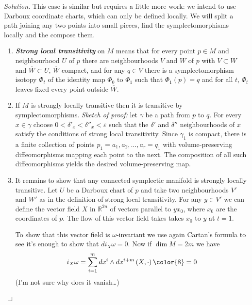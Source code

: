 \begin{proof}[Solution]\leavevmode
This case is similar but requires a little more work: we intend to use Darboux coordinate charts, which can only be defined locally. We will split a path joining any two points into small pieces, find the symplectomorphisms locally and the compose them.
\begin{enumerate}
\item \textit{\textbf{Strong local transitivity}} on $M$ means that for every point $p\in M$ and neighbourhood $U$ of $p$ there are neighbourhoods $V$ and $W$ of $p$ with $\overline{V}\subset W$ and $\overline{W} \subset U$, $\overline{W}$ compact, and for any $q \in V$ there is a symplectomorphism isotopy $\Phi_t$ of the identity map $\Phi_0$ to $\Phi_1$ such that $\Phi_1(p)=q$ and for all  $t$, $\Phi_t$ leaves fixed every point outside $\overline{W}$.
\item If $M$ is strongly locally transitive then it is transitive by symplectomorphisms. \textit{Sketch of proof:} let $\gamma$ be a path from $p$ to $q$. For every $x \in \gamma$ choose $0<\delta'_x<\delta''_x<\varepsilon$  such that the $\delta'$ and $\delta''$ neighbourhoods of $x$ satisfy the conditions of strong local transitivity. Since $\gamma_1$ is compact, there is a finite collection of points $p_1=a_1,a_2,\ldots,a_r=q_1$ with volume-preserving diffeomorphisms mapping each point to the next. The composition of all such diffeomorphisms yields the desired volume-preserving map.
\item It remains to show that any connected symplectic manifold is strongly locally transitive. Let $U$ be a Darboux chart of $p$ and take two neighbourhoods $V'$ and $W'$ as in the definition of strong local transitivity. For any  $y \in V'$ we can define the vector field $X$ in $\mathbb{R}^{2n}$ of vectors parallel to $yx_0$, where $x_0$ are the coordinates of $p$. The flow of this vector field takes takes $x_0$ to $y$ at $t=1$.

To show that this vector field is $\omega$-invariant we use again Cartan's formula to see it's enough to show that $di_X\omega=0$. Now if $\dim M=2m$ we have
\[i_X\omega=\sum_{i=1}^m dx^i\wedge dx^{i+m}\left(X,\cdot \right){\color{8}=0}\]
({\color{8}I'm not sure why does it vanish…})
\end{enumerate}


\end{proof}

\vspace{1em}

